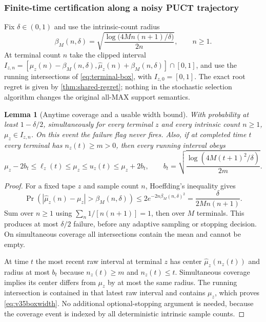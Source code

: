 \documentclass{article}
\theoremstyle{plain}
\newtheorem{lemma}[theorem]{Lemma}
\theoremstyle{definition}
\begin{document}
\subsubsection{Finite-time certification along a noisy PUCT trajectory}
\label{sec:v35cert}
Fix $\delta\in(0,1)$ and use the intrinsic-count radius
\begin{equation}
 \beta_M(n,\delta)
 =\sqrt{\frac{\log\big(4Mn(n+1)/\delta\big)}{2n}},
 \qquad n\ge1.
 \label{eq:v35radius}
\end{equation}
At terminal count $n$ take the clipped interval
$I_{z,n}=[\widehat\mu_z(n)-\beta_M(n,\delta),
 \widehat\mu_z(n)+\beta_M(n,\delta)]\cap[0,1]$,
and use the running intersections of \eqref{eq:terminal-box}, with $I_{z,0}=[0,1]$.
The exact root regret is given by \cref{thm:shared-regret}; nothing in the stochastic selection
algorithm changes the original all-MAX support semantics.

\begin{lemma}[Anytime coverage and a usable width bound]
\label{lem:v35width}
With probability at least $1-\delta/2$, simultaneously for every
terminal $z$ and every intrinsic count $n\ge1$,
$\mu_z\in I_{z,n}$. On this event the failure flag never fires. Also,
if at completed time $t$ every terminal has $n_z(t)\ge m>0$,
then every running interval obeys
\begin{equation}
 \mu_z-2b_t\le\ell_z(t)\le\mu_z
 \le u_z(t)\le\mu_z+2b_t,
 \qquad
 b_t=\sqrt{\frac{\log(4M(t+1)^2/\delta)}{2m}}.
 \label{eq:v35boxwidth}
\end{equation}
\end{lemma}
\begin{proof}
For a fixed tape $z$ and sample count $n$, Hoeffding's inequality
gives
\[
 \Pr(|\widehat\mu_z(n)-\mu_z|>\beta_M(n,\delta))
 \le 2e^{-2n\beta_M(n,\delta)^2}
 =\frac{\delta}{2Mn(n+1)}.
\]
Sum over $n\ge1$ using $\sum_n1/[n(n+1)]=1$, then over $M$
terminals. This produces at most $\delta/2$ failure, before any
adaptive sampling or stopping decision. On simultaneous coverage
all intersections contain the mean and cannot be empty.

At time $t$ the most recent raw interval at terminal $z$ has
center $\widehat\mu_z(n_z(t))$ and radius at most $b_t$ because
$n_z(t)\ge m$ and $n_z(t)\le t$. Simultaneous coverage implies its
center differs from $\mu_z$ by at most the same radius. The running
intersection is contained in that latest raw interval and contains
$\mu_z$, which proves \eqref{eq:v35boxwidth}. No additional
optional-stopping argument is needed, because the coverage event is
indexed by all deterministic intrinsic sample counts.
\end{proof}
\end{document}

